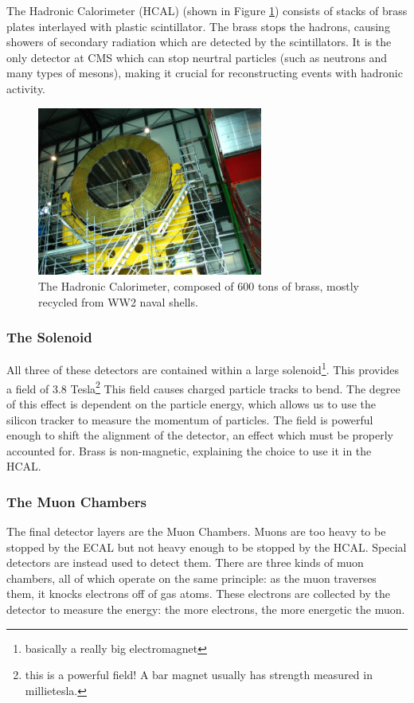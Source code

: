 The Hadronic Calorimeter (HCAL) (shown in Figure \ref{Fig:CMS:Hadronic}) consists of stacks of brass plates interlayed with plastic scintillator. The brass stops the hadrons, causing showers of secondary radiation which are detected by the scintillators. It is the only detector at CMS which can stop neurtral particles (such as neutrons and many types of mesons), making it crucial for reconstructing events with hadronic activity.
\begin{figure}[h!]
    \centering
        \includegraphics[width=0.66\textwidth]{F3/hcal}
        \caption{The Hadronic Calorimeter, composed of 600 tons of brass, mostly recycled from WW2 naval shells.}
        \label{Fig:CMS:Hadronic}
\end{figure}
\subsubsection{The Solenoid}
All three of these detectors are contained within a large solenoid\footnote{basically a really big electromagnet}. This provides a field of 3.8 Tesla\footnote{this is a powerful field! A bar magnet usually has strength measured in millietesla.} This field causes charged particle tracks to bend. The degree of this effect is dependent on the particle energy, which allows us to use the silicon tracker to measure the momentum of particles. The field is powerful enough to shift the alignment of the detector, an effect which must be properly accounted for. Brass is non-magnetic, explaining the choice to use it in the HCAL. 
\subsubsection{The Muon Chambers}
The final detector layers are the Muon Chambers. Muons are too heavy to be stopped by the ECAL but not heavy enough to be stopped by the HCAL. Special detectors are instead used to detect them. There are three kinds of muon chambers, all of which operate on the same principle: as the muon traverses them, it knocks electrons off of gas atoms. These electrons are collected by the detector to measure the energy: the more electrons, the more energetic the muon.
